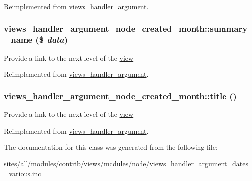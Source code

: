 Reimplemented from \hyperlink{classviews__handler__argument_ad03acefdb44288d7e6c7793bc33f66c}{views\_\-handler\_\-argument}.\hypertarget{classviews__handler__argument__node__created__month_1376f79ca0408659bea06caa51ce6da6}{
\subsubsection[{summary\_\-name}]{\setlength{\rightskip}{0pt plus 5cm}views\_\-handler\_\-argument\_\-node\_\-created\_\-month::summary\_\-name (\$ {\em data})}}
\label{classviews__handler__argument__node__created__month_1376f79ca0408659bea06caa51ce6da6}


Provide a link to the next level of the \hyperlink{classview}{view} 

Reimplemented from \hyperlink{classviews__handler__argument_4c55a340453eed4d35c69f7ac790cac1}{views\_\-handler\_\-argument}.\hypertarget{classviews__handler__argument__node__created__month_3dbf8aaf46f210de7c29c36abfb7a2d6}{
\subsubsection[{title}]{\setlength{\rightskip}{0pt plus 5cm}views\_\-handler\_\-argument\_\-node\_\-created\_\-month::title ()}}
\label{classviews__handler__argument__node__created__month_3dbf8aaf46f210de7c29c36abfb7a2d6}


Provide a link to the next level of the \hyperlink{classview}{view} 

Reimplemented from \hyperlink{classviews__handler__argument_76181ac24e7be4a09aaafc1fa5f15ea1}{views\_\-handler\_\-argument}.

The documentation for this class was generated from the following file:\begin{CompactItemize}
\item 
sites/all/modules/contrib/views/modules/node/views\_\-handler\_\-argument\_\-dates\_\-various.inc\end{CompactItemize}
